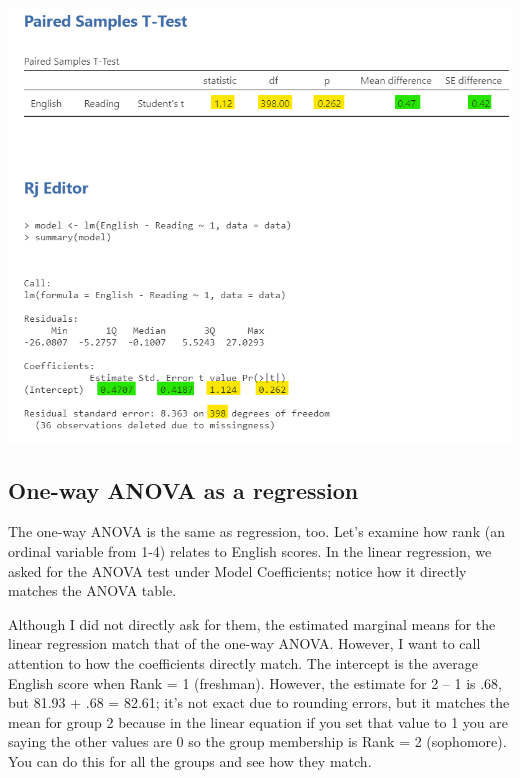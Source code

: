 \documentclass[
]{book}
\begin{document}
\includegraphics{images/14-regression-wrap-up/dependent_t-test.png}

\hypertarget{one-way-anova-as-a-regression}{%
\subsection{One-way ANOVA as a regression}\label{one-way-anova-as-a-regression}}

The one-way ANOVA is the same as regression, too. Let's examine how rank (an ordinal variable from 1-4) relates to English scores. In the linear regression, we asked for the ANOVA test under Model Coefficients; notice how it directly matches the ANOVA table.

Although I did not directly ask for them, the estimated marginal means for the linear regression match that of the one-way ANOVA. However, I want to call attention to how the coefficients directly match. The intercept is the average English score when Rank = 1 (freshman). However, the estimate for 2 -- 1 is .68, but 81.93 + .68 = 82.61; it's not exact due to rounding errors, but it matches the mean for group 2 because in the linear equation if you set that value to 1 you are saying the other values are 0 so the group membership is Rank = 2 (sophomore). You can do this for all the groups and see how they match.
\end{document}
